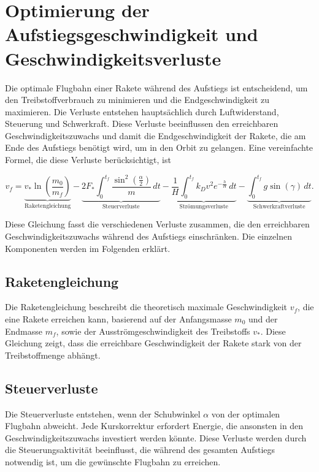 %
%
%
%

\section{Optimierung der Aufstiegsgeschwindigkeit und Geschwindigkeitsverluste \label{leo:section:aufstiegsgleichung}}

Die optimale Flugbahn einer Rakete während des Aufstiegs ist entscheidend, um den Treibstoffverbrauch zu minimieren und die Endgeschwindigkeit zu maximieren. 
Die Verluste entstehen hauptsächlich durch Luftwiderstand, Steuerung und Schwerkraft. 
Diese Verluste beeinflussen den erreichbaren Geschwindigkeitszuwachs und damit die Endgeschwindigkeit der Rakete, die am Ende des Aufstiegs benötigt wird, um in den Orbit zu gelangen. 
Eine vereinfachte Formel, die diese Verluste berücksichtigt, ist

\begin{equation}
	v_f = \underbrace{v_* \ln \left(\frac{m_0}{m_f}\right)}_{\text{Raketengleichung}} 
	- \underbrace{2F_* \int_0^{t_f} \frac{\sin^2\left(\frac{\alpha}{2}\right)}{m} \, dt }_{\text{Steuerverluste}}
	- \underbrace{\frac{1}{H} \int_0^{t_f} k_Dv^2 e^{-\frac{h}{H}} \, dt }_{\text{Strömungsverluste}}
	- \underbrace{\int_0^{t_f} g \sin \left(\gamma\right) \, dt}_{\text{Schwerkraftverluste}}.
	\label{leo:aufstiegsgleichung}
\end{equation}

Diese Gleichung fasst die verschiedenen Verluste zusammen, die den erreichbaren Geschwindigkeitszuwachs während des Aufstiegs einschränken. 
Die einzelnen Komponenten werden im Folgenden erklärt.

\subsection{Raketengleichung}
Die Raketengleichung beschreibt die theoretisch maximale Geschwindigkeit \(v_f\), die eine Rakete erreichen kann, basierend auf der Anfangsmasse \(m_0\) und der Endmasse \(m_f\), sowie der Ausströmgeschwindigkeit des Treibstoffs \(v_*\). 
Diese Gleichung zeigt, dass die erreichbare Geschwindigkeit der Rakete stark von der Treibstoffmenge abhängt.

\subsection{Steuerverluste}
Die Steuerverluste entstehen, wenn der Schubwinkel \(\alpha\) von der optimalen Flugbahn abweicht. 
Jede Kurskorrektur erfordert Energie, die ansonsten in den Geschwindigkeitszuwachs investiert werden könnte. 
Diese Verluste werden durch die Steuerungsaktivität beeinflusst, die während des gesamten Aufstiegs notwendig ist, um die gewünschte Flugbahn zu erreichen.

